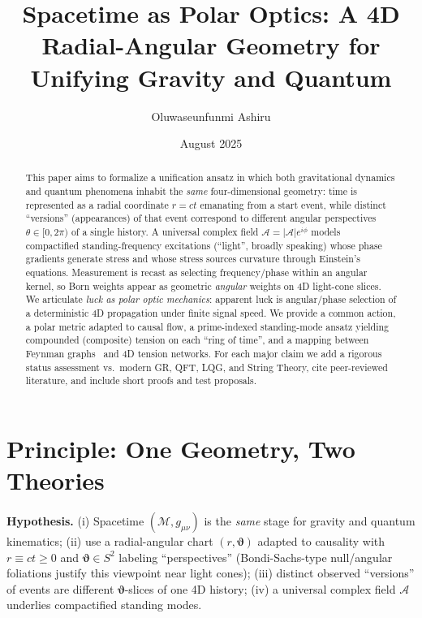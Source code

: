 \documentclass[reprint,amsmath,amssymb,aps,pra]{revtex4-2} %
\newcommand{\M}{\mathcal{M}}                   %
\newcommand{\g}{g}                             %
\newcommand{\A}{\mathcal{A}}                   %
\newcommand{\polangb}{\boldsymbol{\vartheta}}  %
\begin{document}
\title{Spacetime as Polar Optics: A 4D Radial-Angular Geometry for Unifying Gravity and Quantum}
\author{Oluwaseunfunmi Ashiru}
\date{August 2025}

\begin{abstract}
  This paper aims to formalize a unification ansatz in which both gravitational dynamics and quantum phenomena inhabit the \emph{same} four-dimensional geometry: time is represented as a radial coordinate $r = ct$ emanating from a start event, while distinct ``versions'' (appearances) of that event correspond to different angular perspectives $\theta \in [0,2\pi)$ of a single history. A universal complex field $\mathcal{A} = |\mathcal{A}| e^{i\phi}$ models compactified standing-frequency excitations (``light'', broadly speaking) whose phase gradients generate stress and whose stress sources curvature through Einstein's equations. Measurement is recast as selecting frequency/phase within an angular kernel, so Born weights appear as geometric \emph{angular} weights on 4D light-cone slices. We articulate \emph{luck as polar optic mechanics}: apparent luck is angular/phase selection of a deterministic 4D propagation under finite signal speed. 
  We provide a common action, a polar metric adapted to causal flow, a prime-indexed standing-mode ansatz yielding compounded (composite) tension on each ``ring of time'', and a mapping between Feynman graphs~\cite{FeynmanHibbs1965} and 4D tension networks. For each major claim we add a rigorous status assessment vs.~modern GR, QFT, LQG, and String Theory, cite peer-reviewed literature, and include short proofs and test proposals.
\end{abstract}

\maketitle

\section{Principle: One Geometry, Two Theories}
\textbf{Hypothesis.}
(i) Spacetime $(\M,\g_{\mu\nu})$ is the \emph{same} stage for gravity and quantum kinematics; (ii) use a radial-angular chart $(r,\polangb)$ adapted to causality with $r\equiv ct\ge 0$ and $\polangb\in S^2$ labeling ``perspectives'' (Bondi-Sachs-type null/angular foliations justify this viewpoint near light cones); (iii) distinct observed ``versions'' of events are different $\polangb$-slices of one 4D history; (iv) a universal complex field $\A$ underlies compactified standing modes.
\end{document}
